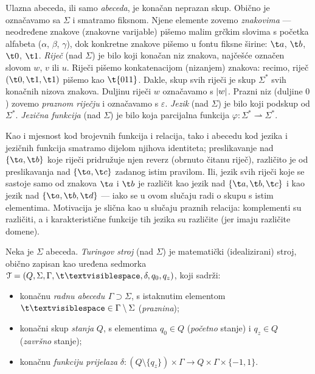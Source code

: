 Ulazna abeceda, ili samo \emph{abeceda}, je konačan neprazan skup. Obično je označavamo sa $\Sigma$ i smatramo fiksnom. Njene elemente zovemo \emph{znakovima} --- ne\-od\-re\-đe\-ne znakove (znakovne varijable) pišemo malim grčkim slovima s početka alfabeta ($\alpha$, $\beta$, $\gamma$), dok konkretne znakove pišemo u fontu fiksne širine: $\t a$, $\t b$, $\t 0$, $\t 1$. \emph{Riječ} (nad $\Sigma$) je bilo koji konačan niz znakova, najčešće označen slovom $w$, $v$ ili $u$. Riječi pišemo konkatenacijom (nizanjem) znakova: recimo, riječ $(\t0,\t1,\t1)$ pišemo kao $\t{011}$. Dakle, skup svih riječi je skup $\Sigma^*$ svih konačnih nizova znakova. Duljinu riječi $w$ označavamo s $\lvert w\rvert$. Prazni niz (duljine $0$) zovemo \emph{praznom riječju} i označavamo s $\varepsilon$. \emph{Jezik} (nad $\Sigma$) je bilo koji podskup od $\Sigma^*$. \emph{Jezična funkcija} (nad $\Sigma$) je bilo koja parcijalna funkcija $\varphi:\Sigma^*\rightharpoonup\Sigma^*$.

\begin{napomena}[{name=[abeceda je dio identiteta jezične funkcije]}]
Kao i mjesnost kod brojevnih funkcija i relacija, tako i abecedu kod jezika i jezičnih funkcija smatramo dijelom njihova identiteta; preslikavanje nad $\{\t a,\t b\}$ koje riječi pridružuje njen reverz (obrnuto čitanu riječ), različito je od preslikavanja nad $\{\t a,\t c\}$ zadanog istim pravilom. Ili, jezik svih riječi koje se sastoje samo od znakova $\t a$ i $\t b$ je različit kao jezik nad $\{\t a,\t b,\t c\}$ i kao jezik nad $\{\t a,\t b,\t d\}$ --- iako se u ovom slučaju radi o skupu s istim elementima. Motivacija je slična kao u slučaju praznih relacija: komplementi su različiti, a i karakteristične funkcije tih jezika su različite (jer imaju različite domene).
\end{napomena}

\begin{definicija}[{name=[Turingov stroj]}]
Neka je $\Sigma$ abeceda. \emph{Turingov stroj} (nad $\Sigma$) je matematički (idealizirani) stroj, obično zapisan kao uređena sedmorka $\mathcal T=(Q,\Sigma,\Gamma,\bl,\delta,q_0,q_z)$, koji sadrži:
\begin{itemize}
\item konačnu \emph{radnu abecedu} $\mspace{1mu}\Gamma\supset\Sigma$, s istaknutim elementom $\bl\in\Gamma\setminus\Sigma$ (\emph{praznina});
    \item konačni skup \emph{stanja} $Q$, s elementima $q_0\in Q$ (\emph{početno} stanje) i $q_z\in Q$ (\emph{završno} stanje);
    \item konačnu \emph{funkciju prijelaza} $\delta:(Q\setminus\{q_z\})\times\Gamma\to Q\times\Gamma\times\{-1,1\}$.\qedhere
\end{itemize}
\end{definicija}

